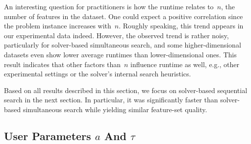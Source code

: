 \documentclass{article}
\theoremstyle{definition}
\begin{document}
An interesting question for practitioners is how the runtime relates to~$n$, the number of features in the dataset.
One could expect a positive correlation since the problem instance increases with~$n$.
Roughly speaking, this trend appears in our experimental data indeed.
However, the observed trend is rather noisy, particularly for solver-based simultaneous search, and some higher-dimensional datasets even show lower average runtimes than lower-dimensional ones.
This result indicates that other factors than~$n$ influence runtime as well, e.g., other experimental settings or the solver's internal search heuristics.

Based on all results described in this section, we focus on solver-based sequential search in the next section.
In particular, it was significantly faster than solver-based simultaneous search while yielding similar feature-set quality.

\subsection{User Parameters \texorpdfstring{$a$ And $\tau$}{}}
\label{sec:afs:evaluation:parameters}
\end{document}
